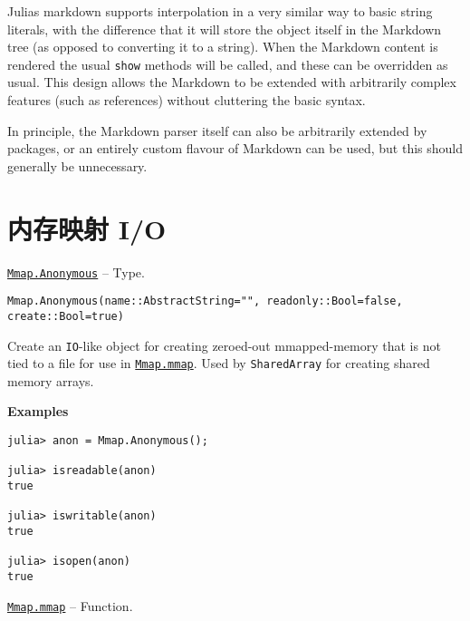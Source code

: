 Julia{\textquotesingle}s markdown supports interpolation in a very similar way to basic string literals, with the difference that it will store the object itself in the Markdown tree (as opposed to converting it to a string). When the Markdown content is rendered the usual \texttt{show} methods will be called, and these can be overridden as usual. This design allows the Markdown to be extended with arbitrarily complex features (such as references) without cluttering the basic syntax.



In principle, the Markdown parser itself can also be arbitrarily extended by packages, or an entirely custom flavour of Markdown can be used, but this should generally be unnecessary.



\hypertarget{1528138219436012362}{}


\chapter{内存映射 I/O}


\hypertarget{8426825172443272214}{} 
\hyperlink{8426825172443272214}{\texttt{Mmap.Anonymous}}  -- {Type.}

\begin{adjustwidth}{2em}{0pt}


\begin{verbatim}
Mmap.Anonymous(name::AbstractString="", readonly::Bool=false, create::Bool=true)
\end{verbatim}

Create an \texttt{IO}-like object for creating zeroed-out mmapped-memory that is not tied to a file for use in \hyperlink{1028440884226576897}{\texttt{Mmap.mmap}}. Used by \texttt{SharedArray} for creating shared memory arrays.

\textbf{Examples}


\begin{verbatim}
julia> anon = Mmap.Anonymous();

julia> isreadable(anon)
true

julia> iswritable(anon)
true

julia> isopen(anon)
true
\end{verbatim}



\end{adjustwidth}
\hypertarget{1028440884226576897}{} 
\hyperlink{1028440884226576897}{\texttt{Mmap.mmap}}  -- {Function.}

